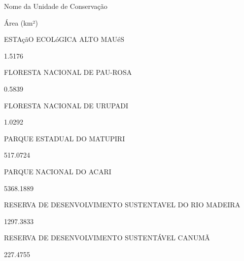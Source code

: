 \documentclass[
  letterpaper,
]{report}
\begin{document}
\n      

Nome da Unidade de Conservação

\n      

Área (km²)

\n    

\n  

\n  

\n    

\n      

ESTAçãO ECOLóGICA ALTO MAUéS

\n      

1.5176

\n    

\n    

\n      

FLORESTA NACIONAL DE PAU-ROSA

\n      

0.5839

\n    

\n    

\n      

FLORESTA NACIONAL DE URUPADI

\n      

1.0292

\n    

\n    

\n      

PARQUE ESTADUAL DO MATUPIRI

\n      

517.0724

\n    

\n    

\n      

PARQUE NACIONAL DO ACARI

\n      

5368.1889

\n    

\n    

\n      

RESERVA DE DESENVOLVIMENTO SUSTENTAVEL DO RIO MADEIRA

\n      

1297.3833

\n    

\n    

\n      

RESERVA DE DESENVOLVIMENTO SUSTENTÁVEL CANUMÃ

\n      

227.4755

\n    
\end{document}
